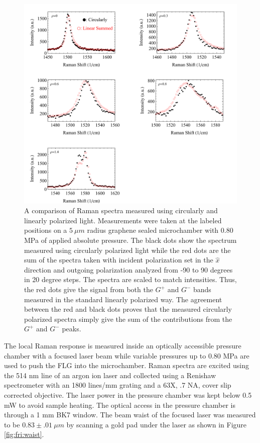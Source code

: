 \begin{figure}
	\begin{center}
	\includegraphics[scale=.75]{Figs_Friction/LinearvsCircular.pdf}
	\end{center}
	\caption[A comparison of Raman spectra measured using circularly and linearly polarized light]{\label{fig:fri:circlelinear}A comparison of Raman spectra measured using circularly and linearly polarized light. Measurements were taken at the labeled positions on a $5 \ \mu m$ radius graphene sealed microchamber with 0.80 MPa of applied absolute pressure. The black dots show the spectrum measured using circularly polarized light while the red dots are the sum of the spectra taken with incident polarization set in the $\hat x$ direction and outgoing polarization analyzed from -90 to 90 degrees in 20 degree steps.  The spectra are scaled to match intensities. Thus, the red dots give the signal from both the $G^+$ and $G^-$ bands measured in the standard linearly polarized way.  The agreement between the red and black dots proves that the measured circularly polarized spectra simply give the sum of the contributions from the $G^+$ and $G^-$ peaks.}
\end{figure}

The local Raman response is measured inside an optically accessible pressure chamber with a focused laser beam while variable pressures up to 0.80 MPa are used to push the FLG into the microchamber.
Raman spectra are excited using the 514 nm line of an argon ion laser and collected using a Renishaw spectrometer with an 1800 lines/mm grating and a 63X, .7 NA, cover slip corrected objective.
The laser power in the pressure chamber was kept below 0.5 mW to avoid sample heating.
The optical access in the pressure chamber is through a 1 mm BK7 window.
The beam waist of the focused laser was measured to be $0.83 \pm .01 \ \mu m$ by scanning a gold pad under the laser as shown in Figure \ref{fig:fri:waist}.

